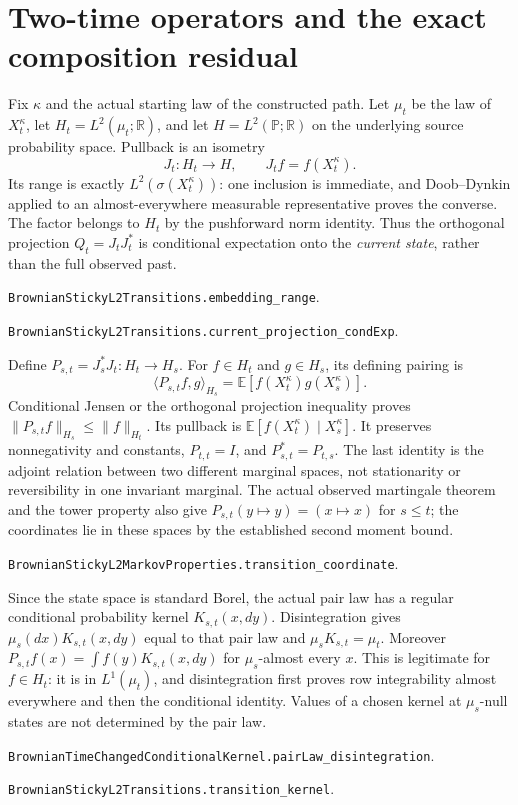 \documentclass[11pt]{article}
\newcommand{\E}{\mathbb E}
\newcommand{\Pp}{\mathbb P}
\newcommand{\R}{\mathbb R}
\newcommand{\code}[1]{\texttt{\small #1}}
\begin{document}
\section{Two-time operators and the exact composition residual}
Fix $\kappa$ and the actual starting law of the constructed path.
Let $\mu_t$ be the law of $X_t^\kappa$, let
$H_t=L^2(\mu_t;\R)$, and let $H=L^2(\Pp;\R)$ on the
underlying source probability space. Pullback is an isometry
\[
 J_t:H_t\longrightarrow H,\qquad J_tf=f(X_t^\kappa).
\]
Its range is exactly $L^2(\sigma(X_t^\kappa))$: one inclusion
is immediate, and Doob--Dynkin applied to an almost-everywhere
measurable representative proves the converse. The factor belongs
to $H_t$ by the pushforward norm identity. Thus the orthogonal
projection $Q_t=J_tJ_t^*$ is conditional expectation onto the
\emph{current state}, rather than the full observed past.
\par\noindent\code{BrownianStickyL2Transitions.embedding\_range}.
\par\noindent\code{BrownianStickyL2Transitions.current\_projection\_condExp}.

Define $P_{s,t}=J_s^*J_t:H_t\to H_s$. For $f\in H_t$ and
$g\in H_s$, its defining pairing is
\[
 \langle P_{s,t}f,g\rangle_{H_s}
      =\E[f(X_t^\kappa)g(X_s^\kappa)].
\]
Conditional Jensen or the orthogonal projection inequality proves
$\|P_{s,t}f\|_{H_s}\leq\|f\|_{H_t}$.
Its pullback is $\E[f(X_t^\kappa)\mid X_s^\kappa]$.
It preserves nonnegativity and constants, $P_{t,t}=I$, and
$P_{s,t}^*=P_{t,s}$. The last identity is the adjoint relation
between two different marginal spaces, not stationarity or
reversibility in one invariant marginal. The actual observed
martingale theorem and the tower property also give
$P_{s,t}(y\mapsto y)=(x\mapsto x)$ for $s\leq t$;
the coordinates lie in these spaces by the established second
moment bound.
\par\noindent\code{BrownianStickyL2MarkovProperties.transition\_coordinate}.

Since the state space is standard Borel, the actual pair law has
a regular conditional probability kernel $K_{s,t}(x,dy)$.
Disintegration gives $\mu_s(dx)K_{s,t}(x,dy)$ equal to that
pair law and $\mu_sK_{s,t}=\mu_t$. Moreover
$P_{s,t}f(x)=\int f(y)K_{s,t}(x,dy)$ for $\mu_s$-almost every
$x$. This is legitimate for $f\in H_t$: it is in $L^1(\mu_t)$,
and disintegration first proves row integrability almost everywhere
and then the conditional identity. Values of a chosen kernel at
$\mu_s$-null states are not determined by the pair law.
\par\noindent\code{BrownianTimeChangedConditionalKernel.pairLaw\_disintegration}.
\par\noindent\code{BrownianStickyL2Transitions.transition\_kernel}.
\end{document}
